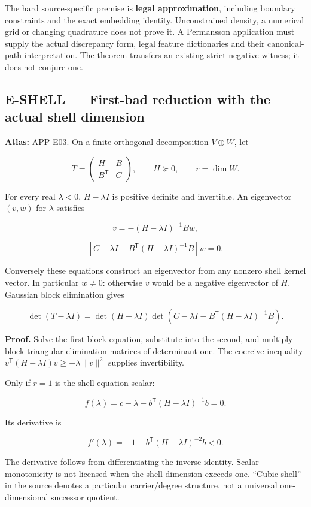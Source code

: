 \documentclass[
  11pt,
  a4paper,
]{article}
\begin{document}
The hard source-specific premise is \textbf{legal approximation},
including boundary constraints and the exact embedding identity.
Unconstrained density, a numerical grid or changing quadrature does not
prove it. A Permansson application must supply the actual discrepancy
form, legal feature dictionaries and their canonical-path
interpretation. The theorem transfers an existing strict negative
witness; it does not conjure one.

\subsection{E-SHELL --- First-bad reduction with the actual shell
dimension}\label{e-shell-first-bad-reduction-with-the-actual-shell-dimension}

\textbf{Atlas:} APP-E03. On a finite orthogonal decomposition
\(V\oplus W\), let

\[T=\begin{pmatrix}H&B\\B^{\mathsf T}&C\end{pmatrix},\qquad H\succeq0,
\qquad r=\dim W.\]

For every real \(\lambda<0\), \(H-\lambda I\) is positive definite and
invertible. An eigenvector \((v,w)\) for \(\lambda\) satisfies

\[v=-(H-\lambda I)^{-1}Bw,\]

\[\left[C-\lambda I-B^{\mathsf T}(H-\lambda I)^{-1}B\right]w=0.\]

Conversely these equations construct an eigenvector from any nonzero
shell kernel vector. In particular \(w\ne0\): otherwise \(v\) would be a
negative eigenvector of \(H\). Gaussian block elimination gives

\[\det(T-\lambda I)=\det(H-\lambda I)
\det\left(C-\lambda I-B^{\mathsf T}(H-\lambda I)^{-1}B\right).\]

\textbf{Proof.} Solve the first block equation, substitute into the
second, and multiply block triangular elimination matrices of
determinant one. The coercive inequality
\(v^{\mathsf T}(H-\lambda I)v\ge-\lambda\|v\|^2\) supplies
invertibility.

Only if \(r=1\) is the shell equation scalar:

\[f(\lambda)=c-\lambda-b^{\mathsf T}(H-\lambda I)^{-1}b=0.\]

Its derivative is

\[f'(\lambda)=-1-b^{\mathsf T}(H-\lambda I)^{-2}b<0.\]

The derivative follows from differentiating the inverse identity. Scalar
monotonicity is not licensed when the shell dimension exceeds one.
``Cubic shell'' in the source denotes a particular carrier/degree
structure, not a universal one-dimensional successor quotient.
\end{document}
